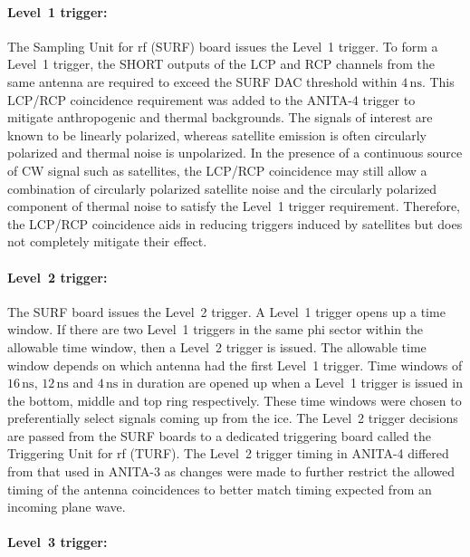 \paragraph{Level~1 trigger:}

The Sampling Unit for \gls{rf} (SURF) board issues the Level~1 trigger.
To form a Level~1 trigger, the SHORT outputs of the LCP and RCP channels from the same antenna 
are required to exceed the SURF DAC threshold within $4\,\mbox{ns}$. This LCP/RCP coincidence requirement 
was added to the ANITA-4 trigger to mitigate anthropogenic and thermal backgrounds.
The signals of
interest are known to be linearly polarized, whereas satellite emission is often circularly polarized
and thermal noise is unpolarized. In the presence of a continuous source of CW signal such as satellites,
the LCP/RCP coincidence may still allow a combination of circularly polarized satellite noise and the circularly polarized component of
thermal noise to satisfy the Level~1 trigger requirement. Therefore, the LCP/RCP coincidence aids in
reducing triggers induced by satellites but does not completely mitigate their effect.

\paragraph{Level~2 trigger:} 

The SURF board issues the Level~2 trigger. 
A Level~1 trigger opens up a time window.
If there are two Level~1 triggers in the same phi sector within the allowable time window, then a Level~2 trigger is issued. 
The allowable time window depends on which antenna had the first Level~1 trigger. 
Time windows of
$16\,\mbox{ns}$, $12\,\mbox{ns}$ and $4\,\mbox{ns}$ in duration are
opened up when a Level~1 trigger is issued in the bottom, middle and top ring respectively.
These time windows were chosen to preferentially select signals coming up from the ice. 
The Level~2 trigger decisions are passed from the SURF boards to a dedicated triggering board called the Triggering Unit for \gls{rf} (TURF).
The Level~2 trigger timing in ANITA-4 differed from that used in ANITA-3 as changes were made to further restrict
the allowed timing of the antenna coincidences to 
better match timing expected from an incoming plane wave.

\paragraph{Level~3 trigger:}

